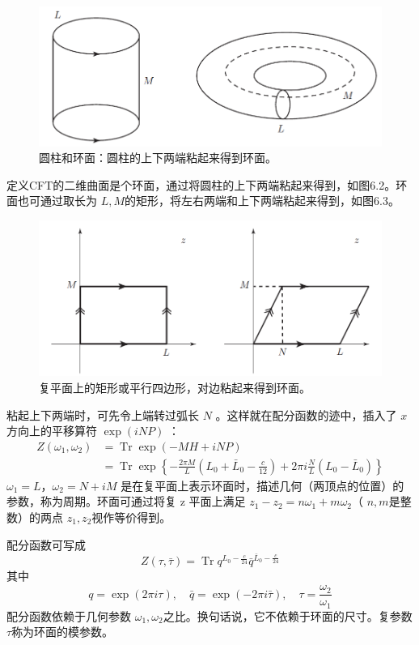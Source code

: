 \begin{figure}[h]
	\centering
	\includegraphics[width=0.6\linewidth]{fig/6.2.png}
	\caption{圆柱和环面：圆柱的上下两端粘起来得到环面。}
\end{figure}

定义CFT的二维曲面是个环面，通过将圆柱的上下两端粘起来得到，如图6.2。环面也可通过取长为 $L,M $的矩形，将左右两端和上下两端粘起来得到，如图6.3。

\begin{figure}[h]
	\centering
	\includegraphics[width=0.6\linewidth]{fig/6.3.png}
	\caption{复平面上的矩形或平行四边形，对边粘起来得到环面。}
\end{figure}

粘起上下两端时，可先令上端转过弧长 $N$ 。这样就在配分函数的迹中，插入了 $x $方向上的平移算符 $\exp (i N P)$ ：
\begin{equation}
	\begin{aligned} Z\left(\omega_{1}, \omega_{2}\right) &=\operatorname{Tr} \exp (-M H+i N P) \\ &=\operatorname{Tr} \exp \left\{-\frac{2 \pi M}{L}\left(L_{0}+\bar{L}_{0}-\frac{c}{12}\right)+2 \pi i \frac{N}{L}\left(L_{0}-\bar{L}_{0}\right)\right\} \end{aligned}
\end{equation}
$\omega_{1}=L $，$ \omega_{2}=N+i M$ 是在复平面上表示环面时，描述几何（两顶点的位置）的参数，称为周期。环面可通过将复 z 平面上满足 $z_{1}-z_{2}=n \omega_{1}+m \omega_{2} $（ $n,m $是整数）的两点 $z_1,z_2 $视作等价得到。

配分函数可写成
\begin{equation}
	Z(\tau, \bar{\tau})=\operatorname{Tr} q^{L_{0}-\frac{c}{24}} \bar{q}^{\bar{L}_{0}-\frac{c}{24}}
\end{equation} 
其中
\begin{equation}
	q=\exp (2 \pi i \tau), \quad \bar{q}=\exp (-2 \pi i \bar{\tau}), \quad \tau=\frac{\omega_{2}}{\omega_{1}} 
\end{equation}
配分函数依赖于几何参数 $\omega_1,\omega_2 $之比。换句话说，它不依赖于环面的尺寸。复参数$ \tau $称为环面的模参数。

